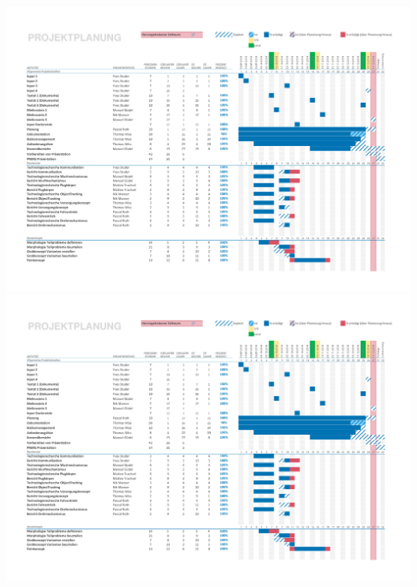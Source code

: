\begin{landscape}
    \includegraphics[page=1,scale=0.8,clip,trim=15mm 22mm 13mm 18mm] {Enddokumentation/Projektplanung_Management/Bilder/Projekt-Planung_Team32.pdf}
    \newpage
    \includegraphics[page=2,scale=0.8,clip,trim=15mm 100mm 13mm 10mm] {Enddokumentation/Projektplanung_Management/Bilder/Projekt-Planung_Team32.pdf}
    \newpage
\end{landscape}
